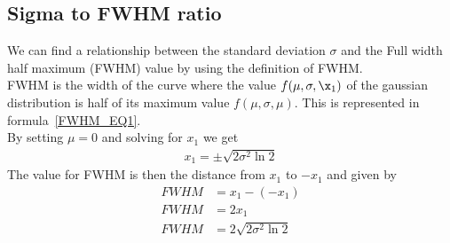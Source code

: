\documentclass[reprint,english,notitlepage]{revtex4-2}
\begin{document}
\subsection{Sigma to FWHM ratio}\label{subsec:sigma-to-fwhm-ratio}
    We can find a relationship between the standard deviation $\sigma$ and the Full width half maximum (FWHM) value by using the definition of FWHM.\\
	FWHM is the width of the curve where the value $f(\mu, \sigma, \x_1)$ of the gaussian distribution is half of its maximum value $f(\mu, \sigma, \mu)$.
	This is represented in formula~\eqref{FWHM_EQ1}.\\
	By setting $\mu = 0$ and solving for $x_1$ we get
	\begin{align*}
	    x_1 = \pm \sqrt{2\sigma^2\ln2}
	\end{align*}
	The value for FWHM is then the distance from $x_1$ to $-x_1$ and given by
	\begin{align*}
	    FWHM &= x_1 - (-x_1)\\
		FWHM &= 2x_1\\
		FWHM &= 2\sqrt{2\sigma^2\ln2}
	\end{align*}



\newpage
\end{document}
